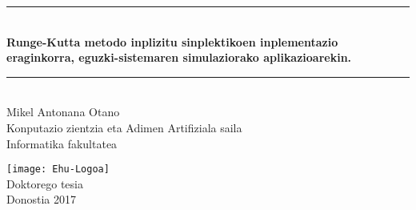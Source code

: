 \begin{titlepage}
\newcommand{\HRule}{\rule{\linewidth}{0.5mm}}
\begin{center}
\HRule \\[0.4cm]
{ \Large \bfseries \sc Runge-Kutta metodo inplizitu sinplektikoen inplementazio eraginkorra, eguzki-sistemaren simulaziorako aplikazioarekin.}\\[0.4cm]



\HRule \\[1cm]
{\Large Mikel Antonana Otano}
\\[.75cm]


{\large Konputazio zientzia eta Adimen Artifiziala saila \\[.1cm]
}
{\large Informatika fakultatea \\[2.cm]
}


\texttt{[image: Ehu-Logoa]}
\\[5cm]

{\large Doktorego tesia\\[.1cm]}
{\large Donostia 2017}




\end{center}
\end{titlepage}\pagebreak